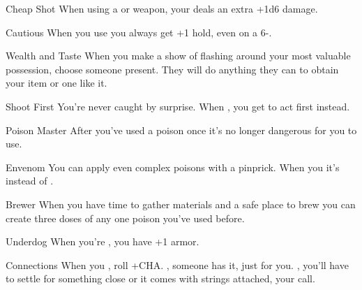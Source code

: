 \documentclass[8pt]{extarticle}
\begin{document}

\begin{multicols}{2}
  \firstAdvances

  \begin{amove}{Cheap Shot}
    When using a  or  weapon, your
     deals an extra +1d6 damage.
  \end{amove}

  \begin{amove}{Cautious}
    When you use  you always get +1 hold, even on a
    6-.
  \end{amove}

  \begin{amove}{Wealth and Taste}
    When you make a show of flashing around your most valuable
    possession, choose someone present. They will do anything they can
    to obtain your item or one like it.
  \end{amove}

  \begin{amove}{Shoot First}
    You’re never caught by surprise. When , you get to act first instead.
  \end{amove}

  \begin{amove}{Poison Master}
    After you’ve used a poison once it’s no longer dangerous for you
    to use.
  \end{amove}

  \begin{amove}{Envenom}
    You can apply even complex poisons with a pinprick. When you
     it’s  instead of .
  \end{amove}

  \begin{amove}{Brewer}
    When you have time to gather materials and a safe place to brew
    you can create three doses of any one poison you’ve used before.
  \end{amove}

  \begin{amove}{Underdog}
    When you’re , you have +1 armor.
  \end{amove}

  \begin{amove}{Connections}
    When you , roll +CHA. \onSuccess, someone has
    it, just for you. \onPartial, you’ll have to settle for something
    close or it comes with strings attached, your call.
  \end{amove}


\end{multicols}
\end{document}
